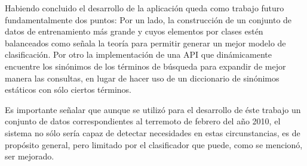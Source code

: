 Habiendo concluido el desarrollo de la aplicación queda como trabajo futuro fundamentalmente dos puntos: Por un lado, la construcción de un conjunto de datos de entrenamiento más grande y cuyos elementos por clases estén balanceados como señala la teoría para permitir generar un mejor modelo de clasificación. Por otro la implementación de una API que dinámicamente encuentre los sinónimos de los términos de búsqueda para expandir de mejor manera las consultas, en lugar de hacer uso de un diccionario de sinónimos estáticos con sólo ciertos términos.

Es importante señalar que aunque se utilizó para el desarrollo de éste trabajo un conjunto de datos correspondientes al terremoto de febrero del año 2010, el sistema no sólo sería capaz de detectar necesidades en estas circunstancias, es de propósito general, pero limitado por el clasificador que puede, como se mencionó, ser mejorado.

	





